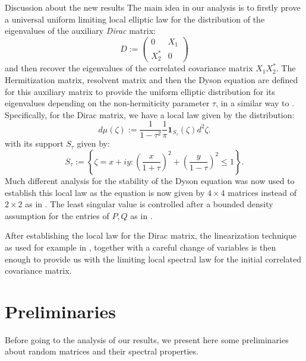 \documentclass[11pt, a4paper, oneside]{book}
\numberwithin{equation}{chapter}
\newcommand{\beq}{\begin{equation}}
\newcommand{\eeq}{\end{equation}}
\begin{document}
\begin{section}{Discussion about the new results}
The main idea in our analysis is to firstly prove a universal uniform limiting local elliptic law for the distribution of the eigenvalues of the auxiliary \textit{Dirac} matrix:
%
\beq \label{1:dirac} D:= \begin{pmatrix} 0 & X_1 \\ X_2^* & 0 \end{pmatrix} \eeq
%
and then recover the eigenvalues of the correlated covariance matrix $X_1 X_2^*$. The Hermitization matrix, resolvent matrix and then the Dyson equation are defined for this auxiliary matrix to provide the uniform elliptic distribution for its eigenvalues depending on the non-hermiticity parameter $\tau$, in a similar way to \cite{alt2022local}. Specifically, for the Dirac matrix, we have a local law given by the distribution:
%
\begin{equation}
d{\mu}(\zeta) := \frac{1}{1-\tau^2} \frac{1}{\pi} \mathbf{1}_{{S}_{\tau}}(\zeta) d^2 \zeta.
\end{equation}
%
with its support ${S}_{\tau}$ given by:
%
\begin{equation}
{S}_{\tau}:= \left \{ \zeta=x+iy : \left ( \frac{x}{1+\tau}\right )^2 + \left ( \frac{y}{1-\tau} \right )^2 \leq 1 \right \}.
\end{equation}
%
%
Much different analysis for the stability of the Dyson equation was now used to establish this local law as the equation is now given by $4\times 4$ matrices instead of $2\times 2$ as in \cite{alt2022local}. The least singular value is controlled after a bounded density assumption for the entries of $P,Q$ as in \cite{alt2021inhomogeneous}.

After establishing the local law for the Dirac matrix, the linearization technique as used for example in \cite{o2015products}, together with a careful change of variables is then enough to provide us with the limiting local spectral law for the initial correlated covariance matrix.

\end{section}
\chapter{Preliminaries}
Before going to the analysis of our results, we present here some preliminaries about random matrices and their spectral properties.
\end{document}
